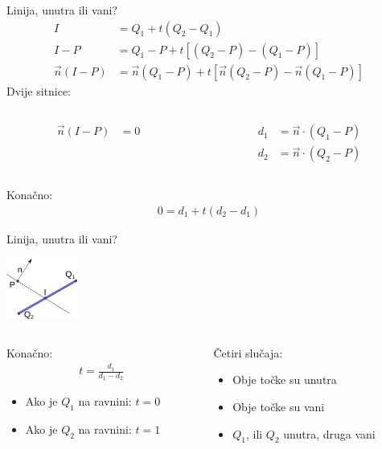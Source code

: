 \documentclass[9pt]{beamer}
\begin{document}
\begin{frame}{Linija, unutra ili vani?}
	\begin{align*}
	I &= Q_1+t(Q_2-Q_1) \\
	I-P &= Q_1-P+t\left[ (Q_2-P)-(Q_1-P)\right] \\
	\vec{n}(I-P) &= \vec{n}(Q_1-P)+t\left[ \vec{n}(Q_2-P)-\vec{n}(Q_1-P)\right]
	\end{align*}
	Dvije sitnice:
	\begin{columns}[t]
		\begin{column}{0.48\textwidth}
			\begin{align*}
			\vec{n}(I-P) &= 0
			\end{align*}
		\end{column}
		\begin{column}{0.48\textwidth}
			\begin{align*}
			d_1 &= \vec{n}\cdot(Q_1-P) \\
			d_2 &= \vec{n}\cdot(Q_2-P)
			\end{align*}
		\end{column}
	\end{columns}
	Konačno:
	\begin{align*}
	0 = d_1+t(d_2-d_1)
	\end{align*}
\end{frame}

\begin{frame}{Linija, unutra ili vani?}
	\begin{center}
		\includegraphics[height=2cm]{slike/p05_04.png}
	\end{center}
	\begin{columns}
		\begin{column}{0.48\textwidth}
			Konačno:
			\begin{align*}
			t = \frac{d_1}{d_1-d_2}
			\end{align*}
			\begin{itemize}
				\item Ako je $Q_1$ na ravnini: $t=0$
				\item Ako je $Q_2$ na ravnini: $t=1$
			\end{itemize}
		\end{column}
		\begin{column}{0.48\textwidth}
			Četiri slučaja:
			\begin{itemize}
				\item Obje točke su unutra
				\item Obje točke su vani
				\item $Q_1$, ili $Q_2$ unutra, druga vani
			\end{itemize}
		\end{column}
	\end{columns}
\end{frame}
\end{document}
